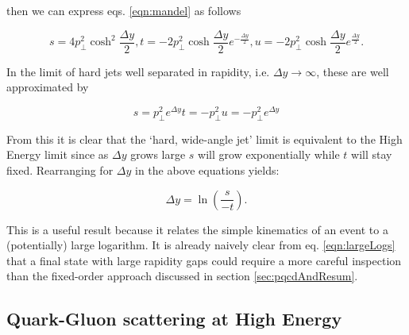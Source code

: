 		then we can express eqs. \eqref{eqn:mandel} as follows

		\begin{subequations}
			\begin{equation}
				s = 4p_\perp^2 \cosh^2\frac{\Delta y}{2},
			\end{equation}
			\begin{equation}
				t = -2p_\perp^2 \cosh\frac{\Delta y}{2}e^{-\frac{\Delta y}{2}},
			\end{equation}
			\begin{equation}
				u = -2p_\perp^2 \cosh\frac{\Delta y}{2}e^{\frac{\Delta y}{2}}.
			\end{equation}
		\end{subequations}

		In the limit of hard jets well separated in rapidity, i.e. $\Delta y\rightarrow\infty$,
		these are well approximated by

		\begin{subequations}
			\begin{equation}
				s = p_\perp^2 e^{\Delta y}
			\end{equation}
			\begin{equation}
				t = -p_\perp^2
			\end{equation}
			\begin{equation}
				u = -p_\perp^2 e^{\Delta y}
			\end{equation}
		\end{subequations}

		From this it is clear that the `hard, wide-angle jet' limit is equivalent to the High Energy
		limit since as $\Delta y$ grows large $s$ will grow exponentially while $t$ will stay fixed.
		Rearranging for $\Delta y$ in the above equations yields:

		\begin{equation}
			\Delta y = \ln \left(\frac{s}{-t}\right).
			\label{eqn:largeLogs}
		\end{equation}

		This is a useful result because it relates the simple kinematics of an event to a (potentially)
		large logarithm.  It is already naively clear from eq. \eqref{eqn:largeLogs} that a final state
		with large rapidity gaps could require a more careful inspection than the fixed-order approach
		discussed in section \ref{sec:pqcdAndResum}.

	\subsection{Quark-Gluon scattering at High Energy}

